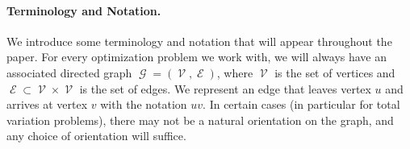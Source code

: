 \documentclass[pdflatex,sn-mathphys-num]{sn-jnl}%
\newcommand{\N}{\mathbb{N}} %
\DeclareMathOperator{\Gcal}{\mathcal{G}}
\DeclareMathOperator{\Ecal}{\mathcal{E}}
\DeclareMathOperator{\Vcal}{\mathcal{V}}
\DeclareMathOperator{\TV}{TV}
\newcommand{\norm}[1]{\left\lVert#1\right\rVert}
\begin{document}

    


\paragraph{Terminology and Notation.}
We introduce some terminology and notation that will appear throughout the  paper. For every optimization problem we work with, we will always have an associated directed graph $\Gcal = (\Vcal, \Ecal)$, where $\Vcal$ is the set of vertices and $\Ecal \subset \Vcal \times \Vcal$ is the set of edges. We represent an edge that leaves vertex $u$ and arrives at vertex $v$ with the notation $uv$.  In certain cases (in particular for total variation problems), there may not be a natural orientation on the graph, and any choice of orientation will suffice.
\end{document}
